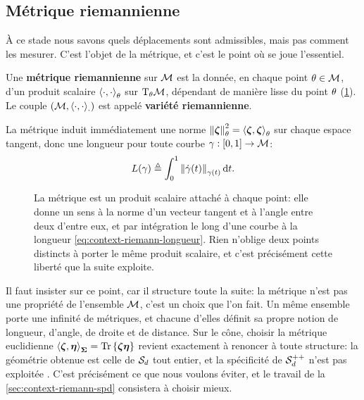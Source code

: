 \subsection{Métrique riemannienne}

À ce stade nous savons quels déplacements sont admissibles, mais pas comment les mesurer. C'est l'objet de la métrique, et c'est le point où se joue l'essentiel.

\begin{definition}
\label{def:context-riemann-metric}
  Une \textbf{métrique riemannienne} sur $\mathcal{M}$ est la donnée, en chaque point $\theta\in\mathcal{M}$, d'un produit scalaire $\left\langle \cdot, \cdot \right\rangle_{\theta}$ sur $\mathrm{T}_{\theta}\mathcal{M}$, dépendant de manière lisse du point $\theta$ (\cref{fig:context-riemann-metrique}). Le couple $(\mathcal{M}, \left\langle \cdot, \cdot \right\rangle_{\cdot})$ est appelé \textbf{variété riemannienne}.
\end{definition}

La métrique induit immédiatement une norme $\left\lVert \boldsymbol{\zeta} \right\rVert_{\theta}^2=\left\langle \boldsymbol{\zeta}, \boldsymbol{\zeta} \right\rangle_{\theta}$ sur chaque espace tangent, donc une longueur pour toute courbe $\gamma:[0,1]\to\mathcal{M}$:
\begin{equation}
  L(\gamma)
  \triangleq
  \int_0^1 \left\lVert \dot{\gamma}(t) \right\rVert_{\gamma(t)}\mathrm{d} t.
  \label{eq:context-riemann-longueur}
\end{equation}

\begin{figure}[htb]
  \centering
  
  \caption{La métrique est un produit scalaire attaché à chaque point: elle
    donne un sens à la norme d'un vecteur tangent et à l'angle entre deux
    d'entre eux, et par intégration le long d'une courbe à la longueur
    \cref{eq:context-riemann-longueur}. Rien n'oblige deux points distincts à
    porter le même produit scalaire, et c'est précisément cette liberté que la
    suite exploite.}
  \label{fig:context-riemann-metrique}
\end{figure}

\begin{remark}
\label{rem:context-riemann-choixmetrique}
  Il faut insister sur ce point, car il structure toute la suite: la métrique n'est pas une propriété de l'ensemble $\mathcal{M}$, c'est un choix que l'on fait. Un même ensemble porte une infinité de métriques, et chacune d'elles définit sa propre notion de longueur, d'angle, de droite et de distance. Sur le cône, choisir la métrique euclidienne $\left\langle \boldsymbol{\zeta}, \boldsymbol{\eta} \right\rangle_{\boldsymbol{\Sigma}}=\operatorname{\operatorname{Tr}}\left\{\boldsymbol{\zeta}\boldsymbol{\eta}\right\}$ revient exactement à renoncer à toute structure: la géométrie obtenue est celle de $\mathcal{S}_{d}$ tout entier, et la spécificité de $\mathcal{S}_{d}^{++}$ n'est pas exploitée . C'est précisément ce que nous voulons éviter, et le travail de la \cref{sec:context-riemann-spd} consistera à choisir mieux.
\end{remark}


